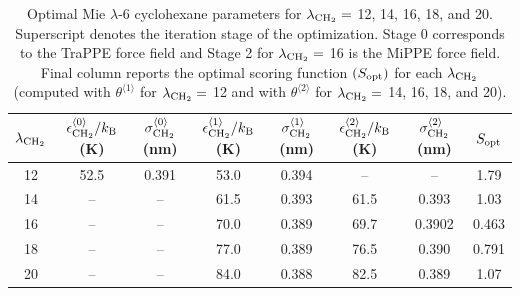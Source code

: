 \documentclass[journal=jced,manuscript=article]{achemso}
\begin{document}

    \begin{table}[h!]
		\caption{Optimal Mie $\lambda$-6 cyclohexane parameters for $\lambda_{\rm CH_2} =$ 12, 14, 16, 18, and 20. Superscript denotes the iteration stage of the optimization. Stage 0 corresponds to the TraPPE force field and Stage 2 for $\lambda_{\rm CH_2} =$ 16 is the MiPPE force field. Final column reports the optimal scoring function $(S_{\rm opt})$ for each $\lambda_{\rm CH_2}$ (computed with $\theta^{\langle1\rangle}$ for $\lambda_{\rm CH_2} =$ 12 and with $\theta^{\langle2\rangle}$ for $\lambda_{\rm CH_2} =$ 14, 16, 18, and 20).} \label{tab:lam opt}
		\begin{center}
			\begin{tabular}{|c|c|c|c|c|c|c|c|}
				\hline
				$\lambda_{\rm CH_2}$ & $\epsilon_{\rm CH_2}^{\langle0\rangle}/k_{\rm B}$ (K) & $\sigma_{\rm CH_2}^{\langle0\rangle}$ (nm) & $\epsilon_{\rm CH_2}^{\langle1\rangle}/k_{\rm B}$ (K) & $\sigma_{\rm CH_2}^{\langle1\rangle}$ (nm) & $\epsilon_{\rm CH_2}^{\langle2\rangle}/k_{\rm B}$ (K) & $\sigma_{\rm CH_2}^{\langle2\rangle}$ (nm) & $S_{\rm opt}$ \\ \hline
				12 & 52.5 & 0.391 & 53.0 & 0.394 & -- & -- & 1.79 \\ 
				14 & -- & -- & 61.5 & 0.393 & 61.5 & 0.393 & 1.03 \\ 
				16 & -- & -- & 70.0 & 0.389 & 69.7 & 0.3902 & 0.463 \\
				18 & -- & -- & 77.0 & 0.389 & 76.5 & 0.390 & 0.791 \\
				20 & -- & -- & 84.0 & 0.388 & 82.5 & 0.389 & 1.07 \\
				\hline
			\end{tabular}
		\end{center} 
	\end{table}
\end{document}
